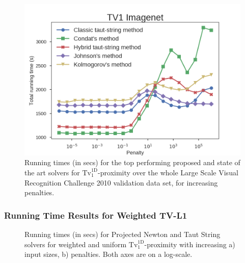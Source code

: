 \documentclass[twoside,11pt]{article}
\newcommand{\tvell}{\text{Tv}}
\newcommand{\oned}{\text{1D}}
\numberwithin{equation}{section}
\numberwithin{theorem}{section}
\begin{document}
\begin{figure}[ht]
  \centering
  \includegraphics[width = \textwidth]{imagesBenchmarkImagenet}
  \caption{Running times (in secs) for the top performing proposed and state of the art solvers for $\tvell_1^{\oned}$-proximity over the whole Large Scale Visual Recognition Challenge 2010 validation data set, for increasing penalties.
   }   \label{fig:tv1imagenet}
\end{figure}

\subsubsection{Running Time Results for Weighted TV-L1}

\begin{figure}[t]
  \centering
  \caption{Running times (in secs) for Projected Newton and Taut String solvers for weighted and uniform $\tvell_1^{\oned}$-proximity with increasing a)  input sizes, b) penalties. Both axes are on a log-scale.
   }   \label{fig:tv1wrun}
\end{figure}
\end{document}
